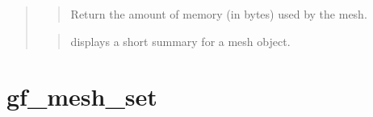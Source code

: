 \documentclass[a4paper,11pt,english]{sphinxmanual}
\begin{document}
\begin{quote}
\sphinxAtStartPar
{}
\begin{quote}

\sphinxAtStartPar
Return the amount of memory (in bytes) used by the mesh.
\end{quote}

\sphinxAtStartPar
{}
\begin{quote}

\sphinxAtStartPar
displays a short summary for a mesh object.
\end{quote}
\end{quote}


\section{gf\_mesh\_set}
\label{\detokenize{scilab/cmdref_gf_mesh_set:gf-mesh-set}}\label{\detokenize{scilab/cmdref_gf_mesh_set::doc}}
\sphinxAtStartPar
{}
\end{document}
